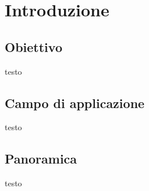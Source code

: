 \chapter{Introduzione}
\section{Obiettivo}
testo

\section{Campo di applicazione}
testo

\section{Panoramica}
testo
